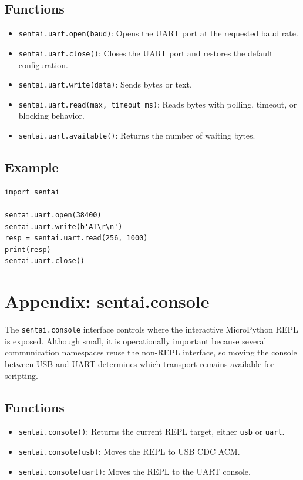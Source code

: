 \subsection{Functions}\label{functions-9}

\begin{itemize}
\tightlist
\item
  \texttt{sentai.uart.open(baud)}: Opens the UART port at the requested
  baud rate.
\item
  \texttt{sentai.uart.close()}: Closes the UART port and restores the
  default configuration.
\item
  \texttt{sentai.uart.write(data)}: Sends bytes or text.
\item
  \texttt{sentai.uart.read(max,\ timeout\_ms)}: Reads bytes with
  polling, timeout, or blocking behavior.
\item
  \texttt{sentai.uart.available()}: Returns the number of waiting bytes.
\end{itemize}

\subsection{Example}\label{example-9}

\begin{verbatim}
import sentai

sentai.uart.open(38400)
sentai.uart.write(b'AT\r\n')
resp = sentai.uart.read(256, 1000)
print(resp)
sentai.uart.close()
\end{verbatim}

\section{Appendix: sentai.console}\label{appendix-sentai.console}

The \texttt{sentai.console} interface controls where the interactive
MicroPython REPL is exposed. Although small, it is operationally
important because several communication namespaces reuse the non-REPL
interface, so moving the console between USB and UART determines which
transport remains available for scripting.

\subsection{Functions}\label{functions-10}

\begin{itemize}
\tightlist
\item
  \texttt{sentai.console()}: Returns the current REPL target, either
  \texttt{usb} or \texttt{uart}.
\item
  \texttt{sentai.console(\textquotesingle{}usb\textquotesingle{})}:
  Moves the REPL to USB CDC ACM.
\item
  \texttt{sentai.console(\textquotesingle{}uart\textquotesingle{})}:
  Moves the REPL to the UART console.
\end{itemize}

